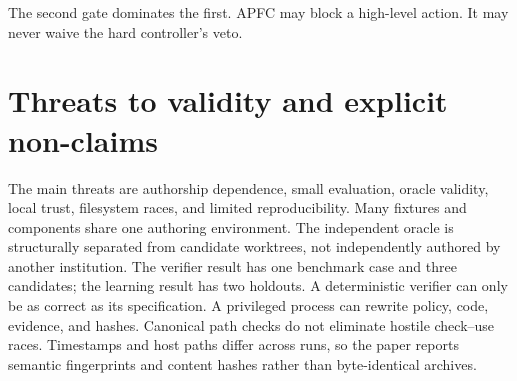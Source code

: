 \documentclass[10pt,twocolumn]{article}
\theoremstyle{definition}
\theoremstyle{plain}
\theoremstyle{remark}
\begin{document}
The second gate dominates the first.  APFC may block a high-level action.  It may never waive the hard controller's veto.

\section{Threats to validity and explicit non-claims}

The main threats are authorship dependence, small evaluation, oracle validity, local trust, filesystem races, and limited reproducibility.  Many fixtures and components share one authoring environment.  The independent oracle is structurally separated from candidate worktrees, not independently authored by another institution.  The verifier result has one benchmark case and three candidates; the learning result has two holdouts.  A deterministic verifier can only be as correct as its specification.  A privileged process can rewrite policy, code, evidence, and hashes.  Canonical path checks do not eliminate hostile check--use races.  Timestamps and host paths differ across runs, so the paper reports semantic fingerprints and content hashes rather than byte-identical archives.
\end{document}
